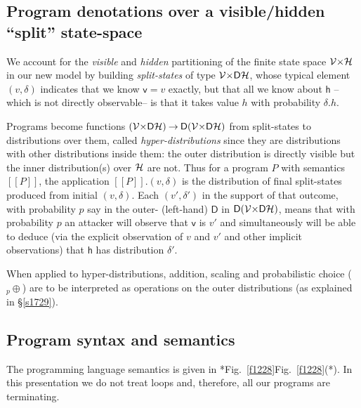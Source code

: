 \documentclass[runningheads]{llncs}
\newcommand\Vh {\mathsf{h}}
\newcommand\Vv {\mathsf{v}}
\newcommand\Sec[1] {Sec.~\ref{#1}}
\renewcommand\Sec[1] {\S\ref{#1}}
\newcommand\VV {{\cal V}}
\newcommand\HH {{\cal H}}
\newcommand\Fun {\mathbin{\rightarrow}}
\newcommand\TDist {\mathsf{D}}
\newcommand\Sem[1] {[\![#1]\!]}
\newcommand\PC[1] {\mathbin{_{#1}\oplus}} \newcommand\UC[1] {\mathbin{_{#1}\uplus}} \newcommand{\ITE}[3]{#1\,\IF\,#2\,\ELSE\,#3}
\newcommand\IF {\textbf{if}}
\newcommand\ELSE {\textbf{else}}
\newcommand\Fig[2][*] {{\def\z{#1}\if*\z Fig.~\ref{#2}\else Fig.~\ref{#2}(#1)\fi}}
\begin{document}
\subsection{Program denotations over a visible/hidden ``split'' state-space}
We account for the \emph{visible} and \emph{hidden} partitioning of the finite state space $\VV{\times}\HH$ in our new model by building \emph{split-states} of type $\VV{\times}\TDist{\HH}$, whose typical element $(v,\delta)$ indicates that we know $\Vv{=}v$ exactly, but that all we know about $\Vh$ --which is not directly observable-- is that it takes value $h$ with probability $\delta.h$. 

Programs become functions $(\VV{\times}\TDist{\HH}) \Fun \TDist{(\VV{\times}\TDist{\HH})}$ from split-states to distributions over them, called \emph{hyper-distributions} since they are distributions with other distributions inside them: the outer distribution is directly visible but the inner distribution(s) over $\HH$ are not. Thus for a program $P$ with semantics $\Sem{P}$, the application $\Sem{P}.(v,\delta)$ is the distribution of final split-states produced from initial $(v,\delta)$. Each $(v',\delta')$ in the support of that outcome, with probability $p$ say in the outer- (left-hand) $\TDist$ in $\TDist{(\VV{\times}\TDist{\HH})}$, means that with probability $p$ an attacker will observe that $\Vv$ is $v'$ and simultaneously will be able to deduce (via the explicit observation of $v$ and $v'$ and other implicit observations) that $\Vh$ has distribution $\delta'$.

When applied to hyper-distributions, addition, scaling and probabilistic choice ($\PC{p}$) are to be interpreted as operations on the outer distributions (as explained in \Sec{s1729}).

\subsection{Program syntax and semantics}\label{s47563}

The programming language semantics is given in \Fig{f1228}. In this presentation we do not treat loops and, therefore, all our programs are terminating. 
\end{document}
